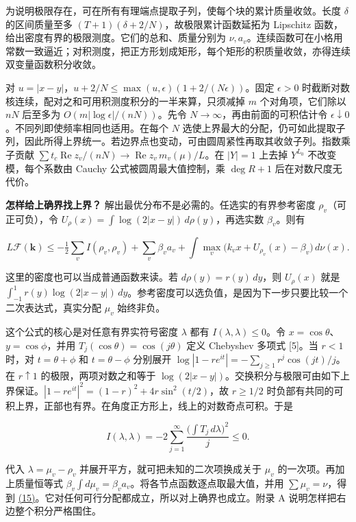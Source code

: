 \documentclass[11pt,a4paper]{article}
\begin{document}
为说明极限存在，可在所有有理端点提取子列，使每个块的累计质量收敛。长度 \(\delta\) 的区间质量至多 \((T+1)(\delta+2/N)\)，故极限累计函数延拓为 Lipschitz 函数，给出密度有界的极限测度。它们的总和、质量分别为 \(\nu,a_v\)。连续函数可在小格用常数一致逼近；对积测度，把正方形划成矩形，每个矩形的积质量收敛，亦得连续双变量函数积分收敛。

对 \(u=|x-y|\)，\(u+2/N\le\max(u,\epsilon)(1+2/(N\epsilon))\)。固定 \(\epsilon>0\) 时截断对数核连续，配对之和可用积测度积分的一半来算，只须减掉 \(m\) 个对角项，它们除以 \(nN\) 后至多为 \(O(m|\log\epsilon|/(nN))\)。先令 \(N\to\infty\)，再由前面的可积估计令 \(\epsilon\downarrow0\)。不同列即使频率相同也适用。在每个 \(N\) 选使上界最大的分配，仍可如此提取子列，因此所得上界统一。若边界点也变动，可由圆周紧性再取其收敛子列。指数乘子贡献 \(\sum t_c\operatorname{Re}z_v/(nN)\to\operatorname{Re}z_v\,m_v(\mu)/L\)。在 \(|Y|=1\) 上去掉 \(Y^{L_0}\) 不改变模，每个系数由 Cauchy 公式被圆周最大值控制，乘 \(\deg R+1\) 后在对数尺度无代价。

\textbf{怎样给上确界找上界？} 解出最优分布不是必需的。任选实的有界参考密度 \(\rho_v\)（可正可负），令 \(U_\rho(x)=\int\log(2|x-y|)\,d\rho(y)\)，再选实数 \(\beta_v\)。则有

\[
 L\mathcal F(\mathbf k)\le
 -\tfrac12\sum_v I(\rho_v,\rho_v)+\sum_v\beta_va_v+
 \int\max_v\big(k_vx+U_{\rho_v}(x)-\beta_v\big)\,d\nu(x).                \tag{15}\label{eq:15}
\]

这里的密度也可以当成普通函数来读。若 \(d\rho(y)=r(y)\,dy\)，则 \(U_\rho(x)\) 就是 \(\int_{-1}^1 r(y)\log(2|x-y|)\,dy\)。参考密度可以选负值，是因为下一步只要比较一个二次表达式，真实分配 \(\mu_v\) 始终非负。

这个公式的核心是对任意有界实符号密度 \(\lambda\) 都有 \(I(\lambda,\lambda)\le0\)。令 \(x=\cos\theta\)、\(y=\cos\phi\)，并用 \(T_j(\cos\theta)=\cos(j\theta)\) 定义 Chebyshev 多项式 {[}5{]}。当 \(r<1\) 时，对 \(t=\theta+\phi\) 和 \(t=\theta-\phi\) 分别展开 \(\log|1-re^{it}|=-\sum_{j\ge1}r^j\cos(jt)/j\)。在 \(r\uparrow1\) 的极限，两项对数之和等于 \(\log(2|x-y|)\)。交换积分与极限可由如下上界保证。\(|1-re^{it}|^2=(1-r)^2+4r\sin^2(t/2)\)，故 \(r\ge1/2\) 时负部有共同的可积上界，正部也有界。在角度正方形上，线上的对数奇点可积。于是

\[
 I(\lambda,\lambda)=-2\sum_{j=1}^{\infty}
            \frac{\big(\int T_j\,d\lambda\big)^2}{j}\le0 .
\]

代入 \(\lambda=\mu_v-\rho_v\) 并展开平方，就可把未知的二次项换成关于 \(\mu_v\) 的一次项。再加上质量恒等式 \(\beta_v\int d\mu_v=\beta_va_v\)。将各节点函数逐点取最大值，并用 \(\sum\mu_v=\nu\)，得到 \hyperref[eq:15]{(15)}。它对任何可行分配都成立，所以对上确界也成立。附录 A 说明怎样把右边整个积分严格围住。
\end{document}
